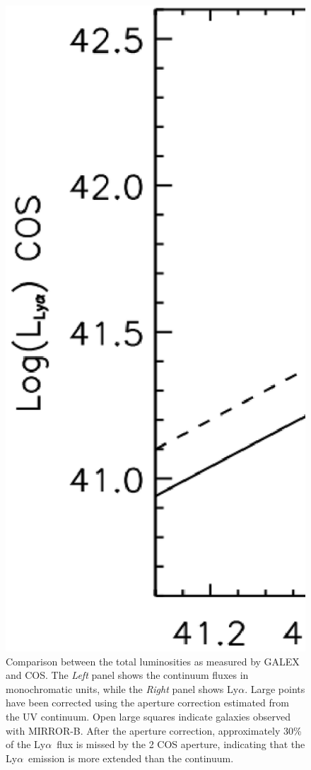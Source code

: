 \documentclass[manuscript]{emulateapj}
\newcommand{\lya}{Ly$\alpha$}
\begin{document}
\begin{figure}[t!]
  \includegraphics[scale=0.36]{Lya_GALEX_COS.ps}
  \caption{Comparison between the total luminosities as measured by GALEX 
	and COS. The \emph{Left} panel shows the continuum fluxes in monochromatic
	units, while the \emph{Right} panel shows \lya. Large
    points have been corrected using the aperture correction estimated
    from the UV continuum. Open large squares indicate galaxies
    observed with MIRROR-B. After the aperture correction,
    approximately 30\% of the \lya\ flux is missed by the 2 COS
    aperture, indicating that the \lya\ emission is more extended than
    the continuum.}
  \label{fig:GALEX_COSflux}
\end{figure}
\end{document}
